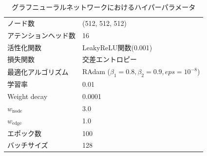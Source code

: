 \begin{table}[H]
 \centering
  \begin{tabular}{ l  l }
   \hline
   ノード数 & (512, 512, 512)\\
   アテンションヘッド数 & 16\\
   活性化関数 & LeakyReLU関数(0.001)\\
   損失関数 & 交差エントロピー\\
   最適化アルゴリズム & RAdam ($\beta_1 = 0.8, \beta_2 = 0.9, eps = 10^{-8}$)\\
   学習率 & 0.01\\
   Weight decay & 0.0001\\
    $w_{\mathrm{node}}$ & 3.0\\
    $w_{\mathrm{edge}}$ & 1.0\\
   エポック数 & 100\\
   バッチサイズ & 128\\
   \hline
  \end{tabular}
  \label{gnnsetting}
  \caption{グラフニューラルネットワークにおけるハイパーパラメータ}
\end{table}
